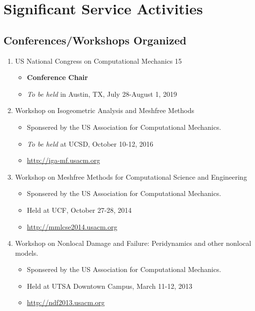 \section*{Significant Service Activities}

\subsection*{Conferences/Workshops Organized}
  \begin{enumerate}
      \item US National Congress on Computational Mechanics 15
          \begin{itemize}
             \item {\bf Conference Chair}
             \item \emph{To be held} in Austin, TX, July 28-August 1, 2019
          \end{itemize}
      \item Workshop on Isogeometric Analysis and Meshfree Methods
          \begin{itemize}
             \item Sponsered by the US Association for Computational Mechanics.
             \item \emph{To be held} at UCSD, October 10-12, 2016
             \item \url{http://iga-mf.usacm.org}
          \end{itemize}
      \item Workshop on Meshfree Methods for Computational Science and Engineering
          \begin{itemize}
             \item Sponsered by the US Association for Computational Mechanics.
             \item Held at UCF, October 27-28, 2014
             \item \url{http://mmlcse2014.usacm.org}
          \end{itemize}
      \item Workshop on Nonlocal Damage and Failure: Peridynamics and other nonlocal models.  
          \begin{itemize}
             \item Sponsered by the US Association for Computational Mechanics.
             \item Held at UTSA Downtown Campus, March 11-12, 2013
             \item \url{http://ndf2013.usacm.org}
          \end{itemize}
  \end{enumerate}

